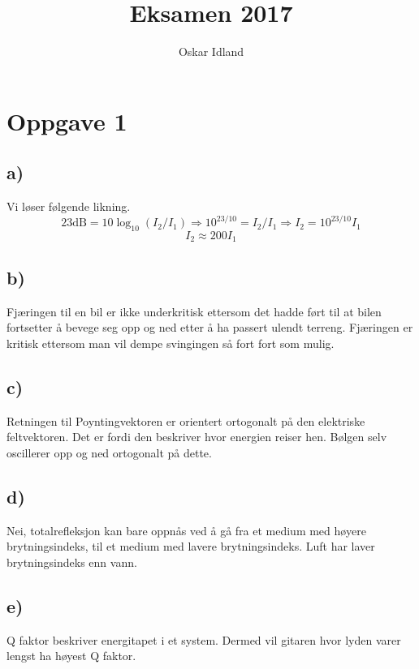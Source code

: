 \documentclass{article}
\author{Oskar Idland}
\title{Eksamen 2017}
\date{}
\begin{document}
\maketitle
\newpage
\section*{Oppgave 1}
  \subsection*{a)}
    Vi løser følgende likning.
    \[
    23 \text{dB} = 10 \log_{10} \left(I_2 / I_1\right) ⇒ 10^{23/10} = I_2 / I_1 ⇒ I_2 = 10^{23/10} I_1
    \]
    \[
    I_2 ≈ 200 I_1
    \]
  
  \subsection*{b)}
    Fjæringen til en bil er ikke underkritisk ettersom det hadde ført til at bilen fortsetter å bevege seg opp og ned etter å ha passert ulendt terreng. Fjæringen er kritisk ettersom man vil dempe svingingen så fort fort som mulig. 
    
  \subsection*{c)}
    Retningen til Poyntingvektoren er orientert ortogonalt på den elektriske feltvektoren. Det er fordi den beskriver hvor energien reiser hen. Bølgen selv oscillerer opp og ned ortogonalt på dette. 
    
  \subsection*{d)}
    Nei, totalrefleksjon kan bare oppnås ved å gå fra et medium med høyere brytningsindeks, til et medium med lavere brytningsindeks. Luft har laver brytningsindeks enn vann. 
  \subsection*{e)}
    Q faktor beskriver energitapet i et system. Dermed vil gitaren hvor lyden varer lengst ha høyest Q faktor. 
    
\end{document}
